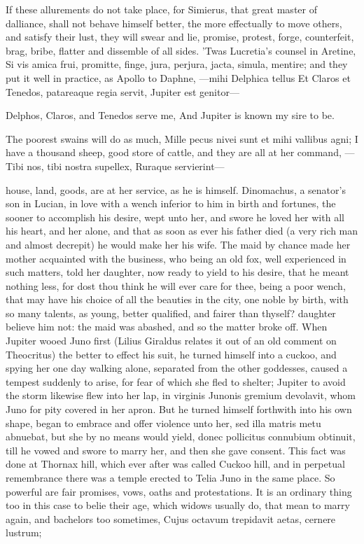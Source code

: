 If these allurements do not take place, for Simierus, that great
master of dalliance, shall not behave himself better, the more
effectually to move others, and satisfy their lust, they will swear and
lie, promise, protest, forge, counterfeit, brag, bribe, flatter and
dissemble of all sides. 'Twas Lucretia's counsel in Aretine, Si vis
amica frui, promitte, finge, jura, perjura, jacta, simula, mentire; and
they put it well in practice, as Apollo to Daphne,
---mihi Delphica tellus
Et Claros et Tenedos, patareaque regia servit,
Jupiter est genitor---

Delphos, Claros, and Tenedos serve me,
And Jupiter is known my sire to be.

The poorest swains will do as much, Mille pecus nivei sunt
et mihi vallibus agni; I have a thousand sheep, good store of cattle,
and they are all at her command,
---Tibi nos, tibi nostra supellex,
Ruraque servierint---

house, land, goods, are at her service, as he is himself. Dinomachus, a
senator's son in Lucian, in love with a wench inferior to him in
birth and fortunes, the sooner to accomplish his desire, wept unto her,
and swore he loved her with all his heart, and her alone, and that as
soon as ever his father died (a very rich man and almost decrepit) he
would make her his wife. The maid by chance made her mother acquainted
with the business, who being an old fox, well experienced in such
matters, told her daughter, now ready to yield to his desire, that he
meant nothing less, for dost thou think he will ever care for thee,
being a poor wench, that may have his choice of all the beauties
in the city, one noble by birth, with so many talents, as young, better
qualified, and fairer than thyself? daughter believe him not: the maid
was abashed, and so the matter broke off. When Jupiter wooed Juno first
(Lilius Giraldus relates it out of an old comment on Theocritus) the
better to effect his suit, he turned himself into a cuckoo, and spying
her one day walking alone, separated from the other goddesses, caused a
tempest suddenly to arise, for fear of which she fled to shelter;
Jupiter to avoid the storm likewise flew into her lap, in virginis
Junonis gremium devolavit, whom Juno for pity covered in her
apron. But he turned himself forthwith into his own shape, began
to embrace and offer violence unto her, sed illa matris metu abnuebat,
but she by no means would yield, donec pollicitus connubium obtinuit,
till he vowed and swore to marry her, and then she gave consent. This
fact was done at Thornax hill, which ever after was called Cuckoo hill,
and in perpetual remembrance there was a temple erected to Telia Juno
in the same place. So powerful are fair promises, vows, oaths and
protestations. It is an ordinary thing too in this case to belie their
age, which widows usually do, that mean to marry again, and bachelors
too sometimes,
Cujus octavum trepidavit aetas,
cernere lustrum;

